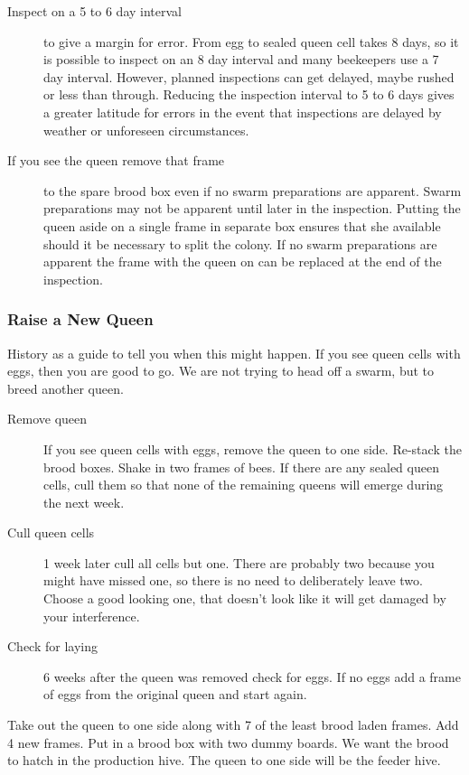 \begin{description}
  \item [Inspect on a 5 to 6 day interval] to give a margin for error.
    From egg to sealed queen cell takes 8 days, so it is possible to inspect on an 8 day interval and many beekeepers use a 7 day interval.
    However, planned inspections can get delayed, maybe rushed or less than through.
    Reducing the inspection interval to 5 to 6 days gives a greater latitude for errors
    in the event that inspections are delayed by weather or unforeseen circumstances.
  \item [If you see the queen remove that frame] to the spare brood box even if no swarm preparations are apparent.
    Swarm preparations may not be apparent until later in the inspection.
    Putting the queen aside on a single frame in separate box ensures that she available should it be necessary to split the colony.
    If no swarm preparations are apparent the frame with the queen on can be replaced at the end of the inspection.
\end{description}

\subsubsection{Raise a New Queen}

History as a guide to tell you when this might happen.
If you see queen cells with eggs,
then you are good to go.
We are not trying to head off a swarm,
but to breed another queen.

\begin{description}
  \item[Remove queen] If you see queen cells with eggs, remove the queen to one side.
    Re-stack the brood boxes.
    Shake in two frames of bees.
    If there are any sealed queen cells, cull them so that none of the remaining queens will emerge during the next week.
  \item[Cull queen cells] 1 week later cull all cells but one.
    There are probably two because you might have missed one, so there is no need to deliberately leave two.
    Choose a good looking one,
    that doesn't look like it will get damaged by your interference.
  \item[Check for laying] 6 weeks after the queen was removed check for eggs.
    If no eggs add a frame of eggs from the original queen
    and start again. 
\end{description}

Take out the queen to one side along with 7 of the least brood laden frames.  
Add 4 new frames.
Put in a brood box with two dummy boards.
We want the brood to hatch in the production hive.
The queen to one side will be the feeder hive.

